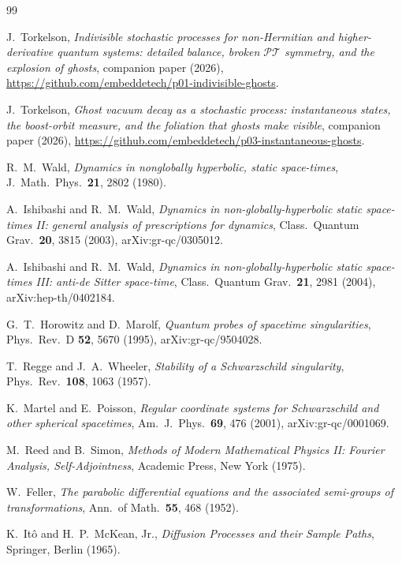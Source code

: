 \documentclass[11pt]{article}
\theoremstyle{definition}
\theoremstyle{remark}
\newcommand{\PT}{\mathcal{PT}}
\begin{document}
\begin{thebibliography}{99}\small

J.~Torkelson,
\emph{Indivisible stochastic processes for non-Hermitian and
higher-derivative quantum systems: detailed balance, broken $\PT$
symmetry, and the explosion of ghosts},
companion paper (2026),
\url{https://github.com/embeddetech/p01-indivisible-ghosts}.

J.~Torkelson,
\emph{Ghost vacuum decay as a stochastic process: instantaneous
states, the boost-orbit measure, and the foliation that ghosts make
visible},
companion paper (2026),
\url{https://github.com/embeddetech/p03-instantaneous-ghosts}.

R.~M.~Wald,
\emph{Dynamics in nonglobally hyperbolic, static space-times},
J.\ Math.\ Phys.\ \textbf{21}, 2802 (1980).

A.~Ishibashi and R.~M.~Wald,
\emph{Dynamics in non-globally-hyperbolic static space-times II:
general analysis of prescriptions for dynamics},
Class.\ Quantum Grav.\ \textbf{20}, 3815 (2003),
arXiv:gr-qc/0305012.

A.~Ishibashi and R.~M.~Wald,
\emph{Dynamics in non-globally-hyperbolic static space-times III:
anti-de Sitter space-time},
Class.\ Quantum Grav.\ \textbf{21}, 2981 (2004),
arXiv:hep-th/0402184.

G.~T.~Horowitz and D.~Marolf,
\emph{Quantum probes of spacetime singularities},
Phys.\ Rev.\ D \textbf{52}, 5670 (1995), arXiv:gr-qc/9504028.

T.~Regge and J.~A.~Wheeler,
\emph{Stability of a Schwarzschild singularity},
Phys.\ Rev.\ \textbf{108}, 1063 (1957).

K.~Martel and E.~Poisson,
\emph{Regular coordinate systems for Schwarzschild and other
spherical spacetimes},
Am.\ J.\ Phys.\ \textbf{69}, 476 (2001), arXiv:gr-qc/0001069.

M.~Reed and B.~Simon,
\emph{Methods of Modern Mathematical Physics II: Fourier Analysis,
Self-Adjointness},
Academic Press, New York (1975).

W.~Feller,
\emph{The parabolic differential equations and the associated
semi-groups of transformations},
Ann.\ of Math.\ \textbf{55}, 468 (1952).

K.~It\^o and H.~P.~McKean, Jr.,
\emph{Diffusion Processes and their Sample Paths},
Springer, Berlin (1965).


\end{thebibliography}
\end{document}
